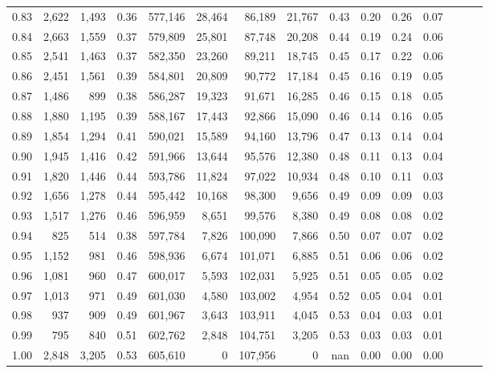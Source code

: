 \begin{tabular}{rrrrrrrrrrrrrrr}
0.83 &   2,622 &  1,493 &  0.36 &  577,146 &   28,464 &   86,189 &   21,767 &  0.43 &  0.20 &  0.26 &      0.07 \\
0.84 &   2,663 &  1,559 &  0.37 &  579,809 &   25,801 &   87,748 &   20,208 &  0.44 &  0.19 &  0.24 &      0.06 \\
0.85 &   2,541 &  1,463 &  0.37 &  582,350 &   23,260 &   89,211 &   18,745 &  0.45 &  0.17 &  0.22 &      0.06 \\
0.86 &   2,451 &  1,561 &  0.39 &  584,801 &   20,809 &   90,772 &   17,184 &  0.45 &  0.16 &  0.19 &      0.05 \\
0.87 &   1,486 &    899 &  0.38 &  586,287 &   19,323 &   91,671 &   16,285 &  0.46 &  0.15 &  0.18 &      0.05 \\
0.88 &   1,880 &  1,195 &  0.39 &  588,167 &   17,443 &   92,866 &   15,090 &  0.46 &  0.14 &  0.16 &      0.05 \\
0.89 &   1,854 &  1,294 &  0.41 &  590,021 &   15,589 &   94,160 &   13,796 &  0.47 &  0.13 &  0.14 &      0.04 \\
0.90 &   1,945 &  1,416 &  0.42 &  591,966 &   13,644 &   95,576 &   12,380 &  0.48 &  0.11 &  0.13 &      0.04 \\
0.91 &   1,820 &  1,446 &  0.44 &  593,786 &   11,824 &   97,022 &   10,934 &  0.48 &  0.10 &  0.11 &      0.03 \\
0.92 &   1,656 &  1,278 &  0.44 &  595,442 &   10,168 &   98,300 &    9,656 &  0.49 &  0.09 &  0.09 &      0.03 \\
0.93 &   1,517 &  1,276 &  0.46 &  596,959 &    8,651 &   99,576 &    8,380 &  0.49 &  0.08 &  0.08 &      0.02 \\
0.94 &     825 &    514 &  0.38 &  597,784 &    7,826 &  100,090 &    7,866 &  0.50 &  0.07 &  0.07 &      0.02 \\
0.95 &   1,152 &    981 &  0.46 &  598,936 &    6,674 &  101,071 &    6,885 &  0.51 &  0.06 &  0.06 &      0.02 \\
0.96 &   1,081 &    960 &  0.47 &  600,017 &    5,593 &  102,031 &    5,925 &  0.51 &  0.05 &  0.05 &      0.02 \\
0.97 &   1,013 &    971 &  0.49 &  601,030 &    4,580 &  103,002 &    4,954 &  0.52 &  0.05 &  0.04 &      0.01 \\
0.98 &     937 &    909 &  0.49 &  601,967 &    3,643 &  103,911 &    4,045 &  0.53 &  0.04 &  0.03 &      0.01 \\
0.99 &     795 &    840 &  0.51 &  602,762 &    2,848 &  104,751 &    3,205 &  0.53 &  0.03 &  0.03 &      0.01 \\
1.00 &   2,848 &  3,205 &  0.53 &  605,610 &        0 &  107,956 &        0 &   nan &  0.00 &  0.00 &      0.00 \\
\bottomrule
\end{tabular}
